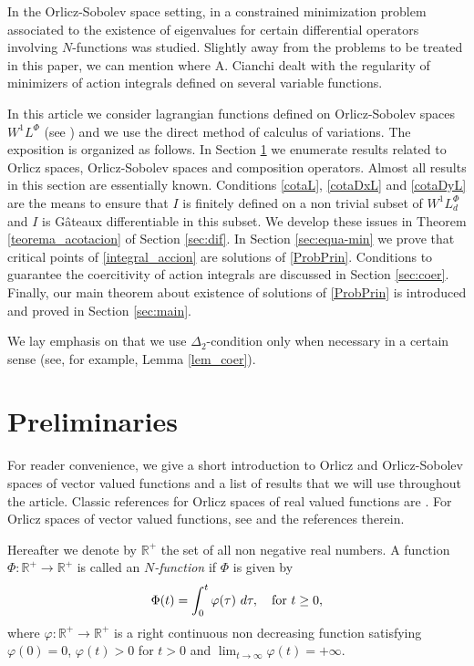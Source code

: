 \documentclass[twoside]{article}
\theoremstyle{remark}
\newcommand{\lphi}{L^{\Phi}}
\begin{document}
  In the Orlicz-Sobolev space setting, 
	in \cite{m-1999} a constrained minimization problem associated to the existence of eigenvalues for certain differential operators involving $N$-functions was studied.  
Slightly away from the problems to be treated in this paper, 
we can mention \cite{cianchi2000local, cianchi1999gradient} where A. Cianchi dealt with 
the regularity of minimizers of action integrals defined on several variable functions.

In this article  we consider lagrangian functions  defined on Orlicz-Sobolev spaces $W^{1}L^{\Phi}$    
(see \cite{adams_sobolev,KR, rao1991theory,2002applications}) 
and we use  the direct method of calculus of variations. 
The exposition is organized as follows. 
In Section \ref{preliminares} we enumerate results related to Orlicz spaces, Orlicz-Sobolev spaces and composition operators. 
Almost all results in this section  are essentially known. Conditions \eqref{cotaL}, \eqref{cotaDxL} and \eqref{cotaDyL} are the means to ensure that $I$ is finitely defined on 
a non trivial subset of $W^{1}\lphi_d$ and $I$ is G\^ateaux differentiable in this subset. We develop  these issues in Theorem \ref{teorema_acotacion}  of Section \ref{sec:dif}. In Section \ref{sec:equa-min} we prove that critical points of \eqref{integral_accion}
 are solutions of \eqref{ProbPrin}. Conditions to guarantee the coercitivity of action integrals are discussed in Section \ref{sec:coer}. Finally, our main theorem about existence of solutions of  \eqref{ProbPrin} is introduced and proved in Section \ref{sec:main}. 

We lay emphasis on that we use $\Delta_2$-condition only when 
necessary in a certain sense (see, for example, Lemma \ref{lem_coer}).
   




\section{Preliminaries}\label{preliminares}


For reader convenience, we give a short introduction to Orlicz and Orlicz-Sobolev spaces of vector valued functions and a  list  of results that we will use throughout the article. 
Classic references for Orlicz spaces of real valued functions are \cite{adams_sobolev,KR,rao1991theory}.
For  Orlicz spaces of vector valued functions, see \cite{Orliczvectorial2005} and the references therein.

Hereafter we denote  by $\mathbb{R}^+$  the set of all non negative real numbers. A function $\Phi:\mathbb{R}^+\to \mathbb{R}^+ $ is called an \emph{$N$-function} if $\Phi$ is given by 
\[
\Phi(t)=\int_{0}^t \varphi(\tau)\ d\tau,\quad\hbox{for } t\geq 0,
\]
where $\varphi:\mathbb{R}^+\rightarrow \mathbb{R}^+$ is a right continuous non decreasing function  satisfying   $\varphi(0)=0$, $\varphi(t)>0$ for $t>0$ and
$\lim_{t\rightarrow \infty}\varphi(t)=+\infty$.
\end{document}
